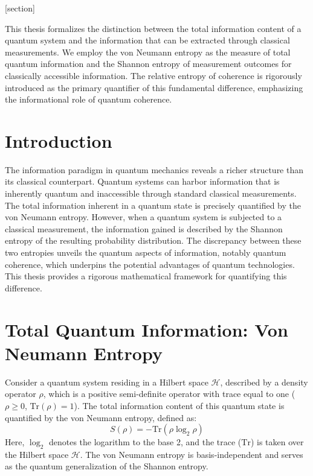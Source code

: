 





\theoremstyle{definition}
[section]













	
	
		This thesis formalizes the distinction between the total information content of a quantum system and the information that can be extracted through classical measurements. We employ the von Neumann entropy as the measure of total quantum information and the Shannon entropy of measurement outcomes for classically accessible information. The relative entropy of coherence is rigorously introduced as the primary quantifier of this fundamental difference, emphasizing the informational role of quantum coherence.

	
	\section{Introduction}
	
	The information paradigm in quantum mechanics reveals a richer structure than its classical counterpart. Quantum systems can harbor information that is inherently quantum and inaccessible through standard classical measurements. The total information inherent in a quantum state is precisely quantified by the von Neumann entropy. However, when a quantum system is subjected to a classical measurement, the information gained is described by the Shannon entropy of the resulting probability distribution. The discrepancy between these two entropies unveils the quantum aspects of information, notably quantum coherence, which underpins the potential advantages of quantum technologies. This thesis provides a rigorous mathematical framework for quantifying this difference.
	
	\section{Total Quantum Information: Von Neumann Entropy}
	
	Consider a quantum system residing in a Hilbert space $\mathcal{H}$, described by a density operator $\rho$, which is a positive semi-definite operator with trace equal to one ($\rho \ge 0$, $\text{Tr}(\rho) = 1$). The total information content of this quantum state is quantified by the von Neumann entropy, defined as:
	\begin{equation}
		S(\rho) = -\text{Tr}(\rho \log_2 \rho)
		\label{eq:von_neumann_entropy}
	\end{equation}
	Here, $\log_2$ denotes the logarithm to the base 2, and the trace ($\text{Tr}$) is taken over the Hilbert space $\mathcal{H}$. The von Neumann entropy is basis-independent and serves as the quantum generalization of the Shannon entropy.
	
